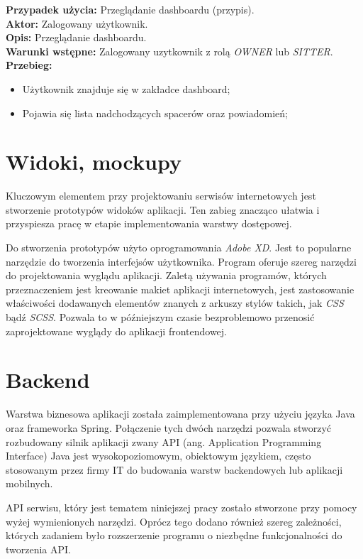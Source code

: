 \noindent
\textbf{Przypadek użycia:} Przeglądanie dashboardu (przypis). \\
\textbf{Aktor:} Zalogowany użytkownik. \\
\textbf{Opis:} Przeglądanie dashboardu. \\
\textbf{Warunki wstępne:} Zalogowany uzytkownik z rolą \textit{OWNER} lub \textit{SITTER}. \\
\textbf{Przebieg:}
\begin{itemize}
    \item Użytkownik znajduje się w zakładce dashboard;
    \item Pojawia się lista nadchodzących spacerów oraz powiadomień;
\end{itemize}

\section{Widoki, mockupy}
Kluczowym elementem przy projektowaniu serwisów internetowych jest stworzenie prototypów widoków aplikacji. Ten zabieg znacząco ułatwia i przyspiesza pracę w etapie implementowania warstwy dostępowej. 

Do stworzenia prototypów użyto oprogramowania \textit{Adobe XD}. Jest to popularne narzędzie do tworzenia interfejsów użytkownika. Program oferuje szereg narzędzi do projektowania wyglądu aplikacji. Zaletą używania programów, których przeznaczeniem jest kreowanie makiet aplikacji internetowych, jest zastosowanie właściwości dodawanych elementów znanych z arkuszy stylów takich, jak \textit{CSS} bądź \textit{SCSS}. Pozwala to w późniejszym czasie bezproblemowo przenosić zaprojektowane wyglądy do aplikacji frontendowej.
\section{Backend}
Warstwa biznesowa aplikacji została zaimplementowana przy użyciu języka Java oraz frameworka Spring. Połączenie tych dwóch narzędzi pozwala stworzyć rozbudowany silnik aplikacji zwany API (ang. Application Programming Interface)
Java jest wysokopoziomowym, obiektowym językiem, często stosowanym przez firmy IT do budowania warstw backendowych lub aplikacji mobilnych. 

API serwisu, który jest tematem niniejszej pracy zostało stworzone przy pomocy wyżej wymienionych narzędzi. Oprócz tego dodano również szereg zależności, których zadaniem było rozszerzenie programu o niezbędne funkcjonalności do tworzenia API.

